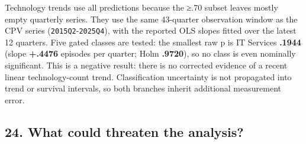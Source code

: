 Technology trends use all predictions because the ≥.70 subset leaves
mostly empty quarterly series. They use the same 43-quarter observation
window as the CPV series (\texttt{2015Q2}-\texttt{2025Q4}), with the
reported OLS slopes fitted over the latest 12 quarters. Five gated
classes are tested: the smallest raw p is IT Services \textbf{.1944}
(slope \textbf{+.4476} episodes per quarter; Holm \textbf{.9720}), so no
class is even nominally significant. This is a negative result: there is
no corrected evidence of a recent linear technology-count trend.
Classification uncertainty is not propagated into trend or survival
intervals, so both branches inherit additional measurement error.

\subsection{24. What could threaten the
analysis?}\label{24-what-could-threaten-the-analysis}

